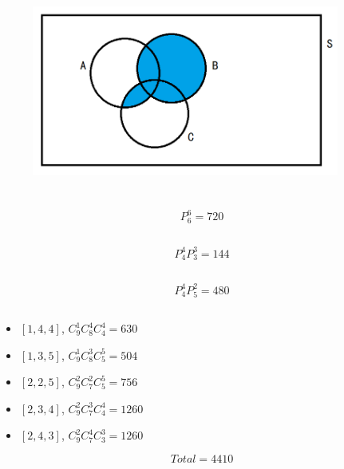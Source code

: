 \documentclass{article}
\begin{document}
        \subsection{}
            \begin{figure}[H]
                \centering
                \includegraphics[width=0.9\textwidth]{img/Assignment1-03.png}
            \end{figure}
    
    \section{}
        \subsection{}
            \paragraph{
                $$P_6^6=720$$
            }
        \subsection{}
            \paragraph{
                $$P_4^4P_3^3=144$$
            }
        \subsection{}
            \paragraph{
                $$P_4^4P_5^2=480$$
            }
        \subsection{}
            \begin{itemize}
                \item $[1,4,4]$, $C_9^1C_8^4C_4^4=630$
                \item $[1,3,5]$, $C_9^1C_8^3C_5^5=504$
                \item $[2,2,5]$, $C_9^2C_7^2C_5^5=756$
                \item $[2,3,4]$, $C_9^2C_7^3C_4^4=1260$
                \item $[2,4,3]$, $C_9^2C_7^4C_3^3=1260$
            \end{itemize}
            $$Total= 4410$$
\end{document}

